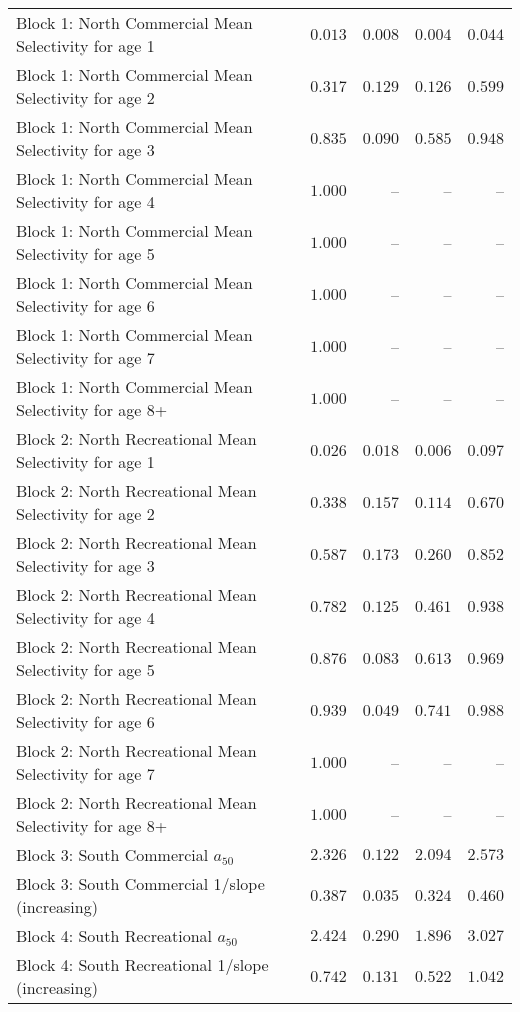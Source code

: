 \documentclass[
]{article}
\begin{document}
\begin{landscape}
\begin{longtable}[t]{lrrrr}
Block 1: North Commercial Mean Selectivity for age 1 & $0.013$ & $0.008$ & $0.004$ & $0.044$\\
Block 1: North Commercial Mean Selectivity for age 2 & $0.317$ & $0.129$ & $0.126$ & $0.599$\\
Block 1: North Commercial Mean Selectivity for age 3 & $0.835$ & $0.090$ & $0.585$ & $0.948$\\
Block 1: North Commercial Mean Selectivity for age 4 & $1.000$ & -- & -- & --\\
\addlinespace
Block 1: North Commercial Mean Selectivity for age 5 & $1.000$ & -- & -- & --\\
Block 1: North Commercial Mean Selectivity for age 6 & $1.000$ & -- & -- & --\\
Block 1: North Commercial Mean Selectivity for age 7 & $1.000$ & -- & -- & --\\
Block 1: North Commercial Mean Selectivity for age 8+ & $1.000$ & -- & -- & --\\
Block 2: North Recreational Mean Selectivity for age 1 & $0.026$ & $0.018$ & $0.006$ & $0.097$\\
\addlinespace
Block 2: North Recreational Mean Selectivity for age 2 & $0.338$ & $0.157$ & $0.114$ & $0.670$\\
Block 2: North Recreational Mean Selectivity for age 3 & $0.587$ & $0.173$ & $0.260$ & $0.852$\\
Block 2: North Recreational Mean Selectivity for age 4 & $0.782$ & $0.125$ & $0.461$ & $0.938$\\
Block 2: North Recreational Mean Selectivity for age 5 & $0.876$ & $0.083$ & $0.613$ & $0.969$\\
Block 2: North Recreational Mean Selectivity for age 6 & $0.939$ & $0.049$ & $0.741$ & $0.988$\\
\addlinespace
Block 2: North Recreational Mean Selectivity for age 7 & $1.000$ & -- & -- & --\\
Block 2: North Recreational Mean Selectivity for age 8+ & $1.000$ & -- & -- & --\\
Block 3: South Commercial $a_{50}$ & $2.326$ & $0.122$ & $2.094$ & $2.573$\\
Block 3: South Commercial 1/slope (increasing) & $0.387$ & $0.035$ & $0.324$ & $0.460$\\
Block 4: South Recreational $a_{50}$ & $2.424$ & $0.290$ & $1.896$ & $3.027$\\
\addlinespace
Block 4: South Recreational 1/slope (increasing) & $0.742$ & $0.131$ & $0.522$ & $1.042$\\

\end{longtable}
\end{landscape}
\end{document}
